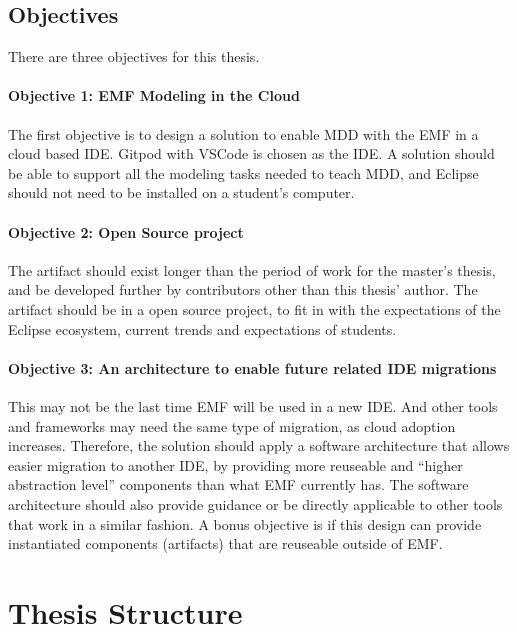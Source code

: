 \subsection{Objectives}

There are three objectives for this thesis.

\paragraph{Objective 1: EMF Modeling in the Cloud}
The first objective is to design a solution to enable \acrfull{MDD} with the \acrfull{EMF} in a cloud based \acrshort{IDE}.
\Gls{Gitpod} with \gls{VSCode} is chosen as the \acrshort{IDE}.
A solution should be able to support all the modeling tasks needed to teach \acrshort{MDD}, and \gls{Eclipse} should not need to be installed on a student's computer.

\paragraph{Objective 2: Open Source project}
The artifact should exist longer than the period of work for the master's thesis, and be developed further by contributors other than this thesis' author.
The artifact should be in a \gls{open source} project, to fit in with the expectations of the Eclipse ecosystem, current trends and expectations of students.

\paragraph{Objective 3: An architecture to enable future related IDE migrations}
This may not be the last time \acrshort{EMF} will be used in a new \acrshort{IDE}.
And other tools and frameworks may need the same type of migration, as \gls{cloud} adoption increases.
Therefore, the solution should apply a software architecture that allows easier migration to another \acrshort{IDE}, by providing more reuseable and ``higher abstraction level'' components than what \acrshort{EMF} currently has.
The software architecture should also provide guidance or be directly applicable to other tools that work in a similar fashion.
A bonus objective is if this design can provide instantiated components (artifacts) that are reuseable outside of \acrshort{EMF}.

\section{Thesis Structure}

